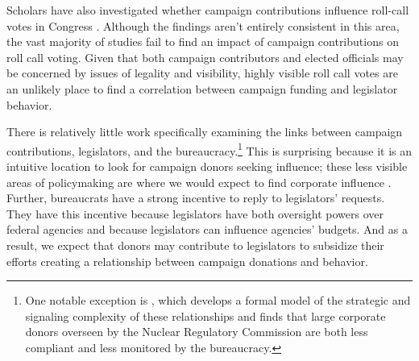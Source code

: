 \documentclass{article}
\begin{document}
Scholars have also investigated whether campaign contributions influence roll-call votes in Congress \citep{AnsolabehereFigueiredoSnyder2003, RoscoeJenkins2005, CalcagnoJackson1998, Chappell1982, ConleyMcCabe2012, EngelJackson1998, Fleisher1993, Grenzke1989, MilyoPrimoGroseclose2000, JonesKeiser1987, KauRubin1982, LanLot1990,Lessig2011, MoorePowellReeves2013, Neustadtl1990, Saltzman1987, Stratmann1991, Stratmann1992, Stratmann1995, Stratmann2002, Wawro2001, Wright1985, Wright1989, Wright1990, Wright2004}.  Although the findings aren't entirely consistent in this area, the vast majority of studies fail to find an impact of campaign contributions on roll call voting. Given that both campaign contributors and elected officials may be concerned by issues of legality and visibility, highly visible roll call votes are an unlikely place to find a correlation between campaign funding and legislator behavior. 

There is relatively little work specifically examining the links between campaign contributions, legislators, and the bureaucracy.\footnote{One notable exception is \citet{GordonHafer2005}, which develops a formal model of the strategic and signaling complexity of these relationships and finds that large corporate donors overseen by the Nuclear Regulatory Commission are both less compliant and less monitored by the bureaucracy.} 
This is surprising because it is an intuitive location to look for campaign donors seeking influence; these less visible areas of policymaking are where we would expect to find corporate influence \citep{Hall1996}.  Further, bureaucrats have a strong incentive to reply to legislators' requests.  They have this incentive because legislators have both oversight powers over federal agencies and because legislators can influence agencies' budgets.  And as a result, we expect that donors may contribute to legislators to subsidize their efforts creating a relationship between campaign donations and behavior. 


\end{document}
